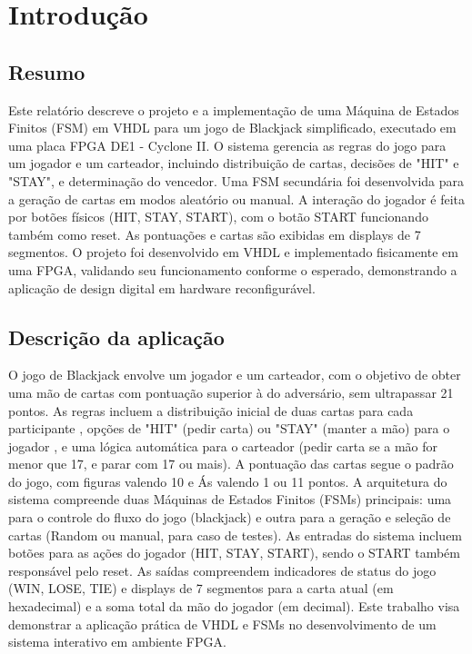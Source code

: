 \documentclass[oneside]{uffstex}
\begin{document}
\imprimircapa%

\tableofcontents*
\cleardoublepage%

\textual%
\chapter{Introdução}
\section{Resumo} 
Este relatório descreve o projeto e a implementação de uma Máquina de Estados Finitos (FSM) em VHDL para um jogo de Blackjack simplificado, executado em uma placa FPGA DE1 - Cyclone II. O sistema gerencia as regras do jogo para um jogador e um carteador, incluindo distribuição de cartas, decisões de "HIT" e "STAY", e determinação do vencedor. Uma FSM secundária foi desenvolvida para a geração de cartas em modos aleatório ou manual. A interação do jogador é feita por botões físicos (HIT, STAY, START), com o botão START funcionando também como reset. As pontuações e cartas são exibidas em displays de 7 segmentos. O projeto foi desenvolvido em VHDL e implementado fisicamente em uma FPGA, validando seu funcionamento conforme o esperado, demonstrando a aplicação de design digital em hardware reconfigurável.
\section{Descrição da aplicação}
O jogo de Blackjack envolve um jogador e um carteador, com o objetivo de obter uma mão de cartas com pontuação superior à do adversário, sem ultrapassar 21 pontos. As regras incluem a distribuição inicial de duas cartas para cada participante , opções de "HIT" (pedir carta) ou "STAY" (manter a mão) para o jogador , e uma lógica automática para o carteador (pedir carta se a mão for menor que 17, e parar com 17 ou mais). A pontuação das cartas segue o padrão do jogo, com figuras valendo 10 e Ás valendo 1 ou 11 pontos.
A arquitetura do sistema compreende duas Máquinas de Estados Finitos (FSMs) principais: uma para o controle do fluxo do jogo (blackjack)  e outra para a geração e seleção de cartas (Random ou manual, para caso de testes). As entradas do sistema incluem botões para as ações do jogador (HIT, STAY, START), sendo o START também responsável pelo reset. As saídas compreendem indicadores de status do jogo (WIN, LOSE, TIE) e displays de 7 segmentos para a carta atual (em hexadecimal) e a soma total da mão do jogador (em decimal). Este trabalho visa demonstrar a aplicação prática de VHDL e FSMs no desenvolvimento de um sistema interativo em ambiente FPGA.
\end{document}
